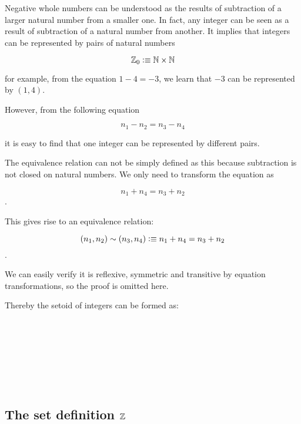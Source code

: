 Negative whole numbers can be understood as the results
of subtraction of a larger natural number from a smaller one. In fact, any integer can be seen as a result of subtraction of a natural number from another. It implies that integers can be represented by pairs of natural numbers


$$\mathbb{Z}_0 \vcentcolon\equiv \mathbb{N} \times \mathbb{N}$$

for example, from the equation $1 - 4 = - 3$, we learn that $- 3$ can be represented by $(1,4)$.

However, from the following equation

$$n_1 - n_2 = n_3 - n_4$$

it is easy to find that one integer can be represented by different pairs.

The equivalence relation can not be simply defined as this because subtraction is not closed on natural numbers. We only need to transform the equation as

$$ n_1 + n_4 = n_3 + n_2$$.

This gives rise to an equivalence relation:


$$(n_1,n_2) \sim (n_3,n_4) \vcentcolon\equiv  n_1 + n_4 = n_3 + n_2$$.

We can easily verify it is reflexive, symmetric and
transitive by equation transformations, so the proof is omitted here.

Thereby the setoid of integers can be formed as:

\begin{code}
\\
\> \AgdaSymbol{:} \<%
\\
\> \AgdaSymbol{=} \<%
\\
\>[2]\<[3]%
\>[3]\AgdaSymbol{\{}  \<[19]%
\>[19]\AgdaSymbol{=} \<%
\\
\>[2]\<[3]%
\>[3]\AgdaSymbol{;}  \<[19]%
\>[19]\AgdaSymbol{=} \<%
\\
\>[2]\<[3]%
\>[3]\AgdaSymbol{;}  \AgdaSymbol{=} \<%
\\
\>[2]\<[3]%
\>[3]\AgdaSymbol{\}}\<%
\end{code}

\subsection{The set definition $\mathbb{Z}$}

